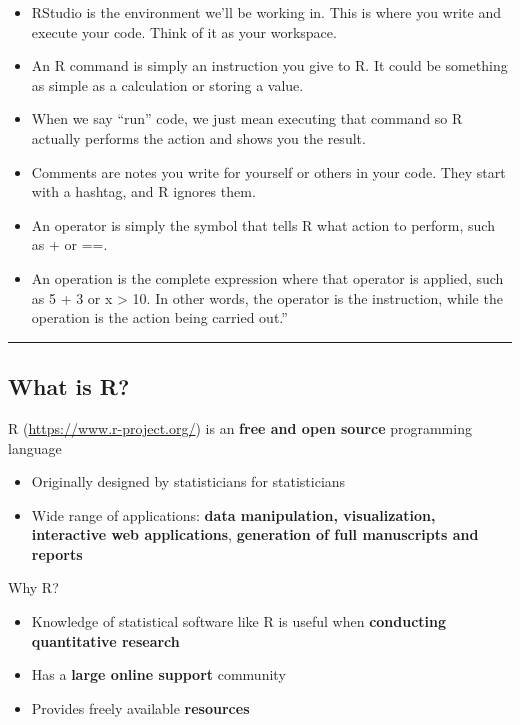 \documentclass[
  letterpaper,
  DIV=11,
  numbers=noendperiod]{scrartcl}
\providecommand{\tightlist}{%
  \setlength{\itemsep}{0pt}\setlength{\parskip}{0pt}}
\begin{document}
\begin{itemize}
\item
  RStudio is the environment we'll be working in. This is where you
  write and execute your code. Think of it as your workspace.
\item
  An R command is simply an instruction you give to R. It could be
  something as simple as a calculation or storing a value.
\item
  When we say ``run'' code, we just mean executing that command so R
  actually performs the action and shows you the result.
\item
  Comments are notes you write for yourself or others in your code. They
  start with a hashtag, and R ignores them.
\item
  An operator is simply the symbol that tells R what action to perform,
  such as + or ==.
\item
  An operation is the complete expression where that operator is
  applied, such as 5 + 3 or x \textgreater{} 10. In other words, the
  operator is the instruction, while the operation is the action being
  carried out.''
\end{itemize}

\begin{center}\rule{0.5\linewidth}{0.5pt}\end{center}

\subsection{What is R?}\label{what-is-r}

R (\url{https://www.r-project.org/}) is an \textbf{free and open source}
programming language

\begin{itemize}
\tightlist
\item
  Originally designed by statisticians for statisticians
\item
  Wide range of applications: \textbf{data manipulation, visualization,
  interactive web applications}, \textbf{generation of full manuscripts
  and reports}
\end{itemize}

Why R?

\begin{itemize}
\tightlist
\item
  Knowledge of statistical software like R is useful when
  \textbf{conducting quantitative research}
\item
  Has a \textbf{large online support} community
\item
  Provides freely available \textbf{resources}
\end{itemize}
\end{document}
